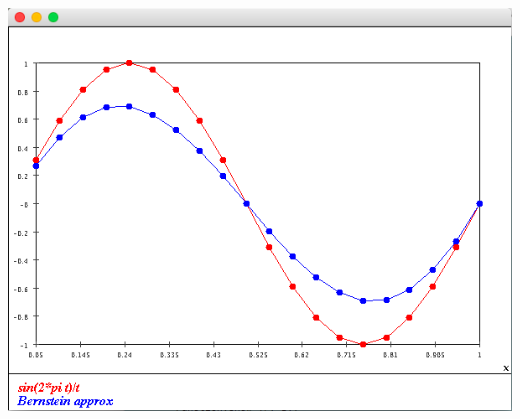 \documentclass{article}
\begin{document}
\begin{enumerate}
\includegraphics[scale=0.3]{bernstein_approx_10}
\end{enumerate}
\end{document}
